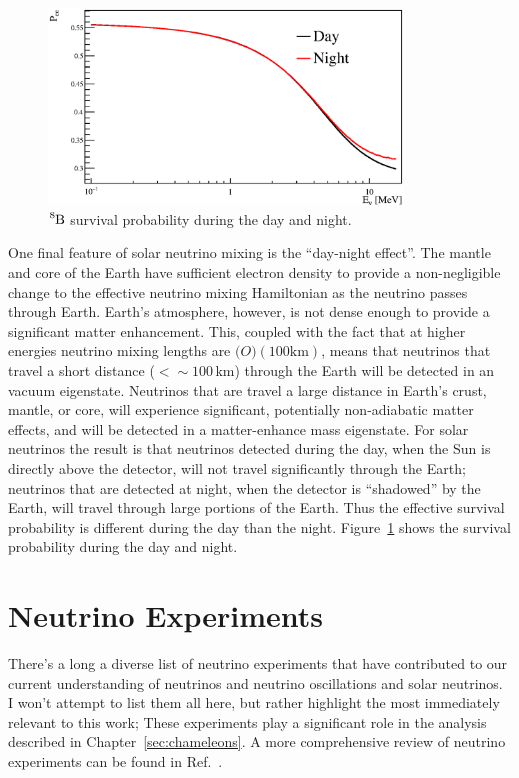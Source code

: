 \begin{figure}[htbp]
\centering
\includegraphics[width=0.84\textwidth]{day_night_example}
    \caption[Day and Night Survival Probability]{$\ce{^{8}B}$ survival
    probability during the day and night.}
\label{fig:day_night_example}
\end{figure}

One final feature of solar neutrino mixing is the ``day-night effect''.
The mantle and core of the Earth have sufficient electron density to provide
a non-negligible change to the effective neutrino mixing Hamiltonian as the neutrino
passes through Earth.
Earth's atmosphere, however, is not dense enough to provide a significant
matter enhancement.
This, coupled with the fact that at higher energies neutrino mixing lengths
are $\mathcal(O)(100\mathrm{ km})$, means that neutrinos that travel a short
distance ($<\sim100$\,km) through the Earth will be detected in an
vacuum eigenstate.
Neutrinos that are travel a large distance in Earth's crust, mantle, or core,
will experience significant, potentially non-adiabatic matter effects, and will
be detected in a matter-enhance mass eigenstate.
For solar neutrinos the result is that neutrinos detected during the day, when
the Sun is directly above the detector, will not travel significantly through
the Earth;
neutrinos that are detected at night, when the detector is ``shadowed'' by the
Earth, will travel through large portions of the Earth.
Thus the effective survival probability is different during the day than the night.
Figure~\ref{fig:day_night_example} shows the survival probability during
the day and night.

\section{Neutrino Experiments}
\label{sec:experiments}
There's a long a diverse list of neutrino experiments that have contributed to
our current understanding of neutrinos and neutrino oscillations and solar neutrinos.
I won't attempt to list them all here, but rather highlight the most immediately
relevant to this work;
These experiments play a significant role in the analysis described in Chapter~\ref{sec:chameleons}.
A more comprehensive review of neutrino experiments can be found in Ref.~\citep{giuntikim}.

